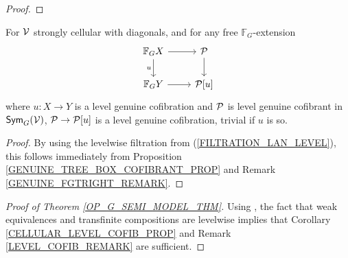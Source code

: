 \documentclass[a4paper,10pt]{article}%
\begin{document}
\begin{proof}

\end{proof} 

\begin{corollary}\label{CELLULAR_LEVEL_COFIB_PROP} 
  For $\V$ strongly cellular with diagonals, and for any free $\mathbb F_G$-extension  
  \[ 
  \begin{tikzcd} 
    \mathbb F_G X \arrow[d, "u"'] \arrow[r] & \P \arrow[d]\\ 
    \mathbb F_G Y \arrow[r] & \P[u] 
  \end{tikzcd} 
  \] 
  where $u: X \to Y$ is a level genuine cofibration and $\P$ is level genuine cofibrant in $\Sym_G(\V)$, $\P \to \P[u]$ is a level genuine cofibration, trivial if $u$ is so. 
\end{corollary}  
\begin{proof} 
  By using the levelwise filtration from (\ref{FILTRATION_LAN_LEVEL}), this follows immediately from Proposition \ref{GENUINE_TREE_BOX_COFIBRANT_PROP} and Remark \ref{GENUINE_FGTRIGHT_REMARK}. 
\end{proof} 


\begin{proof}[Proof of Theorem \ref{OP_G_SEMI_MODEL_THM}] 
  Using \cite[Lemma 2.3]{SS00}, the fact that weak equivalences and transfinite compositions are levelwise implies that Corollary \ref{CELLULAR_LEVEL_COFIB_PROP} and Remark \ref{LEVEL_COFIB_REMARK} are sufficient.
\end{proof} 
\end{document}
